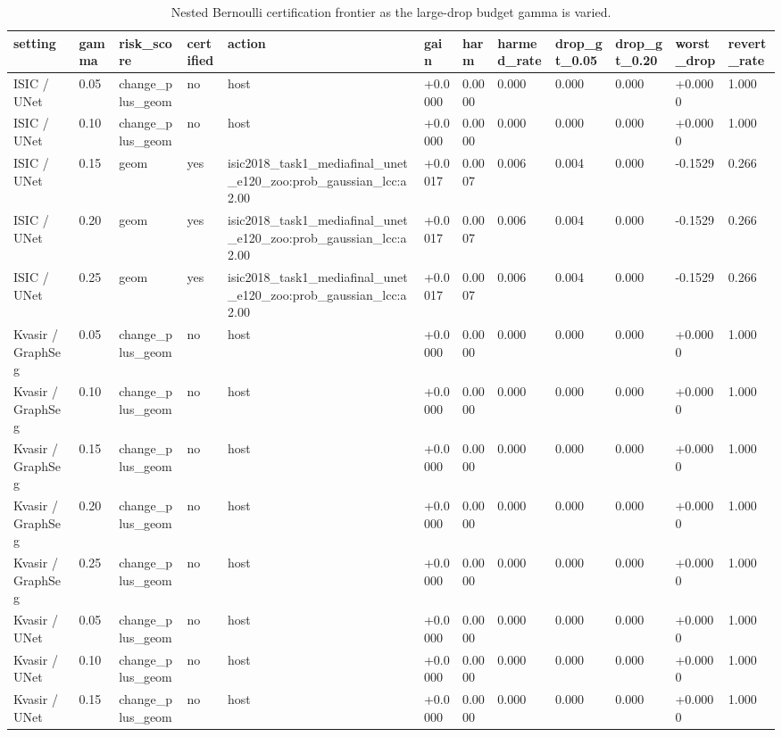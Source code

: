 \begin{table}[t]
\centering
\small
\caption{Nested Bernoulli certification frontier as the large-drop budget gamma is varied.}
\label{tab:nested_certification_frontier}
\begin{tabular}{llllllllllll}
\toprule
setting & gamma & risk\_score & certified & action & gain & harm & harmed\_rate & drop\_gt\_0.05 & drop\_gt\_0.20 & worst\_drop & revert\_rate \\
\midrule
ISIC / UNet & 0.05 & change\_plus\_geom & no & host & +0.0000 & 0.0000 & 0.000 & 0.000 & 0.000 & +0.0000 & 1.000 \\
ISIC / UNet & 0.10 & change\_plus\_geom & no & host & +0.0000 & 0.0000 & 0.000 & 0.000 & 0.000 & +0.0000 & 1.000 \\
ISIC / UNet & 0.15 & geom & yes & isic2018\_task1\_mediafinal\_unet\_e120\_zoo:prob\_gaussian\_lcc:a2.00 & +0.0017 & 0.0007 & 0.006 & 0.004 & 0.000 & -0.1529 & 0.266 \\
ISIC / UNet & 0.20 & geom & yes & isic2018\_task1\_mediafinal\_unet\_e120\_zoo:prob\_gaussian\_lcc:a2.00 & +0.0017 & 0.0007 & 0.006 & 0.004 & 0.000 & -0.1529 & 0.266 \\
ISIC / UNet & 0.25 & geom & yes & isic2018\_task1\_mediafinal\_unet\_e120\_zoo:prob\_gaussian\_lcc:a2.00 & +0.0017 & 0.0007 & 0.006 & 0.004 & 0.000 & -0.1529 & 0.266 \\
Kvasir / GraphSeg & 0.05 & change\_plus\_geom & no & host & +0.0000 & 0.0000 & 0.000 & 0.000 & 0.000 & +0.0000 & 1.000 \\
Kvasir / GraphSeg & 0.10 & change\_plus\_geom & no & host & +0.0000 & 0.0000 & 0.000 & 0.000 & 0.000 & +0.0000 & 1.000 \\
Kvasir / GraphSeg & 0.15 & change\_plus\_geom & no & host & +0.0000 & 0.0000 & 0.000 & 0.000 & 0.000 & +0.0000 & 1.000 \\
Kvasir / GraphSeg & 0.20 & change\_plus\_geom & no & host & +0.0000 & 0.0000 & 0.000 & 0.000 & 0.000 & +0.0000 & 1.000 \\
Kvasir / GraphSeg & 0.25 & change\_plus\_geom & no & host & +0.0000 & 0.0000 & 0.000 & 0.000 & 0.000 & +0.0000 & 1.000 \\
Kvasir / UNet & 0.05 & change\_plus\_geom & no & host & +0.0000 & 0.0000 & 0.000 & 0.000 & 0.000 & +0.0000 & 1.000 \\
Kvasir / UNet & 0.10 & change\_plus\_geom & no & host & +0.0000 & 0.0000 & 0.000 & 0.000 & 0.000 & +0.0000 & 1.000 \\
Kvasir / UNet & 0.15 & change\_plus\_geom & no & host & +0.0000 & 0.0000 & 0.000 & 0.000 & 0.000 & +0.0000 & 1.000 \\

\end{tabular}
\end{table}
